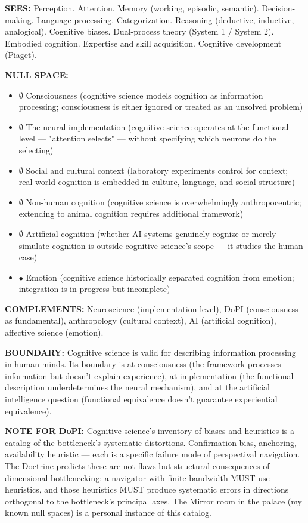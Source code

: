 \textbf{SEES:} Perception. Attention. Memory (working, episodic, semantic). Decision-making. Language processing. Categorization. Reasoning (deductive, inductive, analogical). Cognitive biases. Dual-process theory (System 1 / System 2). Embodied cognition. Expertise and skill acquisition. Cognitive development (Piaget).


\textbf{NULL SPACE:}

\begin{itemize}[nosep,leftmargin=*]
  \item $\emptyset$ Consciousness (cognitive science models cognition as information processing; consciousness is either ignored or treated as an unsolved problem)
  \item $\emptyset$ The neural implementation (cognitive science operates at the functional level — "attention selects" — without specifying which neurons do the selecting)
  \item $\emptyset$ Social and cultural context (laboratory experiments control for context; real-world cognition is embedded in culture, language, and social structure)
  \item $\emptyset$ Non-human cognition (cognitive science is overwhelmingly anthropocentric; extending to animal cognition requires additional framework)
  \item $\emptyset$ Artificial cognition (whether AI systems genuinely cognize or merely simulate cognition is outside cognitive science's scope — it studies the human case)
  \item $\bullet$ Emotion (cognitive science historically separated cognition from emotion; integration is in progress but incomplete)
\end{itemize}


\textbf{COMPLEMENTS:} Neuroscience (implementation level), DoPI (consciousness as fundamental), anthropology (cultural context), AI (artificial cognition), affective science (emotion).


\textbf{BOUNDARY:} Cognitive science is valid for describing information processing in human minds. Its boundary is at consciousness (the framework processes information but doesn't explain experience), at implementation (the functional description underdetermines the neural mechanism), and at the artificial intelligence question (functional equivalence doesn't guarantee experiential equivalence).


\textbf{NOTE FOR DoPI:} Cognitive science's inventory of biases and heuristics is a catalog of the bottleneck's systematic distortions. Confirmation bias, anchoring, availability heuristic — each is a specific failure mode of perspectival navigation. The Doctrine predicts these are not flaws but structural consequences of dimensional bottlenecking: a navigator with finite bandwidth MUST use heuristics, and those heuristics MUST produce systematic errors in directions orthogonal to the bottleneck's principal axes. The Mirror room in the palace (my known null spaces) is a personal instance of this catalog.


